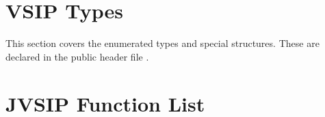 \section*{VSIP Types}
This section covers the enumerated types and special structures. These are declared in the public header file . 
\section*{JVSIP Function List} 










